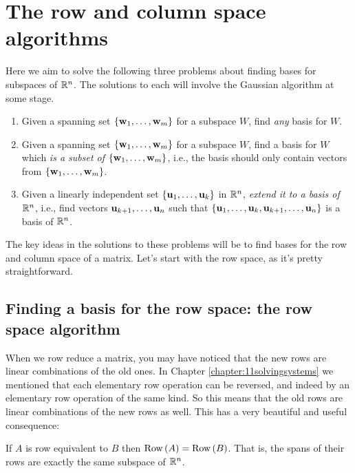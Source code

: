 \chapter{%
The row and column space algorithms}\label{chapter:16basiscol}

Here we aim to solve the following three problems about finding bases for subspaces of $\mathbb{R}^n$. The solutions to each will involve the Gaussian algorithm at some stage.

\begin{enumerate}\label{FindingBases}
\item Given a spanning set $\{\mathbf{w}_1, \dots ,\mathbf{w}_m \}$ for a subspace $W$, find {\it any} basis for $W$.
\medskip
\item Given a spanning set $\{\mathbf{w}_1, \dots ,\mathbf{w}_m \}$ for a subspace $W$, find a basis for $W$ which {\it is a subset of} $\{\mathbf{w}_1, \dots ,\mathbf{w}_m \}$, i.e., the basis should only contain vectors from $\{\mathbf{w}_1, \dots ,\mathbf{w}_m \}$.
\medskip
\item Given a linearly independent set $\{\mathbf{u}_1, \dots ,\mathbf{u}_k \}$ in $\mathbb{R}^n$, {\it extend it to a basis of $\mathbb{R}^n$}, i.e., find vectors $\mathbf{u}_{k+1}, \dots, \mathbf{u}_n$ such that $\{\mathbf{u}_1, \dots ,\mathbf{u}_k,\mathbf{u}_{k+1}, \dots, \mathbf{u}_n  \}$ is a basis of $\mathbb{R}^n$.
\end{enumerate}

The key ideas in the solutions to these problems will be to find bases for the row and column space of a matrix. Let's start with the row space, as it's pretty straightforward.

\section[The row space algorithm]{Finding a basis for the row space: the row space algorithm}

When we row reduce a matrix, you may have noticed that the new rows are linear combinations  of the old ones. In Chapter \ref{chapter:11solvingsystems} we mentioned  that each elementary row operation can be reversed, and indeed by an elementary row operation of the same kind. So this means that the old rows are linear combinations of the new rows as well. This has a very beautiful and useful consequence:



\begin{proposition}\label{rowspaceInvariance}
If $A$ is row equivalent to $B$ then $\operatorname{Row\,}(A) = \operatorname{Row\,}(B)$.
That is, the spans of their rows are exactly the same subspace
of $\mathbb{R}^n$.
\end{proposition}

